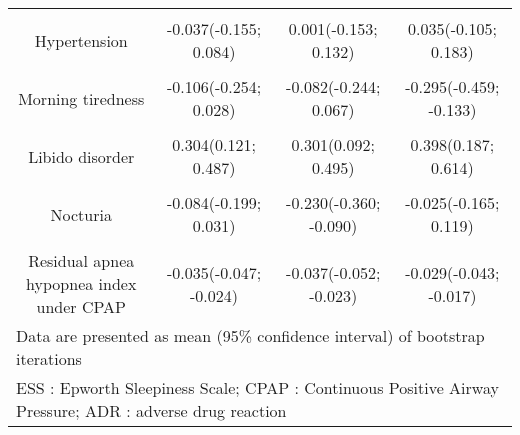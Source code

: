 \documentclass{article}
\begin{document}
\begin{table}[H]
\begin{tabular}[t]{cccc}
\cellcolor{gray!6}{Gender (male)} & \cellcolor{gray!6}{-0.002(-0.152; 0.145)} & \cellcolor{gray!6}{0.073(-0.090; 0.231)} & \cellcolor{gray!6}{-0.016(-0.194; 0.152)}\\
Hypertension & -0.037(-0.155; 0.084) & 0.001(-0.153; 0.132) & 0.035(-0.105; 0.183)\\
\cellcolor{gray!6}{Restless legs syndrome} & \cellcolor{gray!6}{0.146(0.005; 0.288)} & \cellcolor{gray!6}{0.069(-0.099; 0.243)} & \cellcolor{gray!6}{0.020(-0.155; 0.183)}\\
Morning tiredness & -0.106(-0.254; 0.028) & -0.082(-0.244; 0.067) & -0.295(-0.459; -0.133)\\
\cellcolor{gray!6}{Morning headaches} & \cellcolor{gray!6}{0.056(-0.106; 0.208)} & \cellcolor{gray!6}{0.052(-0.116; 0.228)} & \cellcolor{gray!6}{-0.093(-0.290; 0.108)}\\
Libido disorder & 0.304(0.121; 0.487) & 0.301(0.092; 0.495) & 0.398(0.187; 0.614)\\
\cellcolor{gray!6}{Night sweating} & \cellcolor{gray!6}{-0.084(-0.236; 0.068)} & \cellcolor{gray!6}{-0.137(-0.321; 0.034)} & \cellcolor{gray!6}{-0.255(-0.446; -0.065)}\\
Nocturia & -0.084(-0.199; 0.031) & -0.230(-0.360; -0.090) & -0.025(-0.165; 0.119)\\
\cellcolor{gray!6}{Pichot's fatigue scale} & \cellcolor{gray!6}{-0.040(-0.050; -0.031)} & \cellcolor{gray!6}{-0.061(-0.073; -0.051)} & \cellcolor{gray!6}{-0.045(-0.057; -0.033)}\\
Residual apnea  hypopnea index under CPAP & -0.035(-0.047; -0.024) & -0.037(-0.052; -0.023) & -0.029(-0.043; -0.017)\\
\bottomrule
\multicolumn{4}{l}{\rule{0pt}{1em}Data are presented as mean (95\% confidence interval) of bootstrap iterations}\\
\multicolumn{4}{l}{\rule{0pt}{1em}ESS : Epworth Sleepiness Scale; CPAP : Continuous Positive Airway Pressure; ADR : adverse drug reaction}\\
\end{tabular}
\end{table}
\clearpage
\begingroup\fontsize{6}{8}\selectfont
\end{document}
